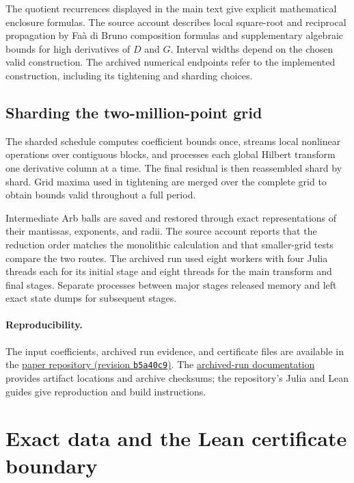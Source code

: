 \documentclass[11pt]{article}
\numberwithin{equation}{section}
\newcommand{\code}[1]{\texttt{#1}}
\begin{document}
The quotient recurrences displayed in the main text give explicit
mathematical enclosure formulas. The source account describes local
square-root and reciprocal propagation by Fa\`a di Bruno composition
formulas and supplementary algebraic bounds for high derivatives of
$D$ and $G$. Interval widths depend on the chosen valid construction.
The archived numerical endpoints refer to the implemented construction,
including its tightening and sharding choices.

\subsection{Sharding the two-million-point grid}

The sharded schedule computes coefficient bounds once, streams local
nonlinear operations over contiguous blocks, and processes each global
Hilbert transform one derivative column at a time. The final residual is
then reassembled shard by shard. Grid maxima used in tightening are merged
over the complete grid to obtain bounds valid throughout a full period.

Intermediate Arb balls are saved and restored through exact
representations of their mantissas, exponents, and radii. The source
account reports that the reduction order matches
the monolithic calculation and that smaller-grid tests compare the two
routes. The archived run used eight workers with four Julia threads each
for its initial stage and eight threads for the main transform and final
stages. Separate processes between major stages released memory and left
exact state dumps for subsequent stages.

\paragraph{Reproducibility.}
The input coefficients, archived run evidence, and certificate files are
available in the
\href{https://github.com/michalshavitNYU/Rigorously-certified-water-waves/tree/b5a40c9fe528cdfa9a302bd7ae377095f3566706}{paper repository (revision \code{b5a40c9})}.
The
\href{https://github.com/michalshavitNYU/Rigorously-certified-water-waves/blob/b5a40c9fe528cdfa9a302bd7ae377095f3566706/Julia/results/phase4_scalar_n150_20260827_2m_20260829/README.md}{archived-run documentation}
provides artifact locations and archive checksums; the repository's Julia
and Lean guides give reproduction and build instructions.

\section{Exact data and the Lean certificate boundary}
\label{sec:certificate}
\end{document}
